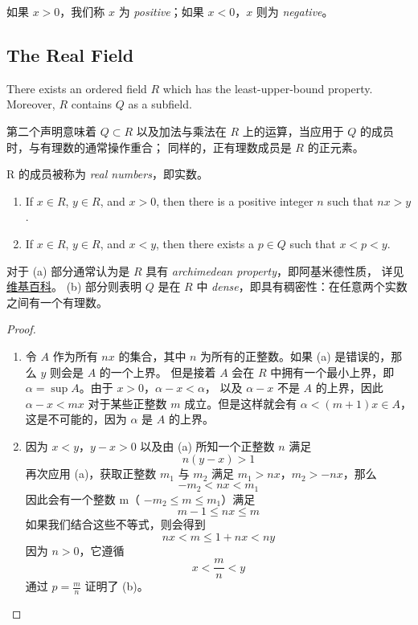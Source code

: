 \documentclass[../poma-notes.tex]{subfiles}
\begin{document}
如果 $x>0$，我们称 $x$ 为 \textit{positive}；如果 $x<0$，$x$ 则为 \textit{negative}。

\subsection*{The Real Field}

\setcounter{poma}{18}
\begin{theorem}
	There exists an ordered field $R$ which has the least-upper-bound property.
	Moreover, $R$ contains $Q$ as a subfield.
\end{theorem}

第二个声明意味着 $Q \subset R$ 以及加法与乘法在 $R$ 上的运算，当应用于 $Q$ 的成员时，与有理数的通常操作重合；
同样的，正有理数成员是 $R$ 的正元素。

R 的成员被称为 \textit{real numbers}，即实数。


\begin{theorem}
	\leavevmode
	\begin{enumerate}[label=(\alph*)]
		\item If $x \in R$, $y \in R$, and $x>0$, then there is a positive integer $n$ such that $nx>y$.
		\item If $x \in R$, $y \in R$, and $x<y$, then there exists a $p \in Q$ such that $x<p<y$.
	\end{enumerate}
\end{theorem}

对于 (a) 部分通常认为是 $R$ 具有 \textit{archimedean property}，即阿基米德性质，
详见\href{https://en.wikipedia.org/wiki/Archimedean_property}{维基百科}。
(b) 部分则表明 $Q$ 是在 $R$ 中 \textit{dense}，即具有稠密性：在任意两个实数之间有一个有理数。

\begin{proof}
	\begin{enumerate}[label=(\alph*)]
		\item 令 $A$ 作为所有 $nx$ 的集合，其中 $n$ 为所有的正整数。如果 (a) 是错误的，那么 $y$ 则会是 $A$ 的一个上界。
		      但是接着 $A$ 会在 $R$ 中拥有一个最小上界，即 $\alpha  = \sup A$。由于 $x>0$，$\alpha - x < \alpha$，
		      以及 $\alpha - x$ 不是 $A$ 的上界，因此 $\alpha - x < mx$ 对于某些正整数 $m$ 成立。但是这样就会有
		      $\alpha < (m+1)x \in A$，这是不可能的，因为 $\alpha$ 是 $A$ 的上界。
		\item 因为 $x<y$，$y-x>0$ 以及由 (a) 所知一个正整数 $n$ 满足
		      \[n(y-x)>1\]
		      再次应用 (a)，获取正整数 $m_1$ 与 $m_2$ 满足 $m_1 > nx$，$m_2 > -nx$，那么
		      \[-m_2 < nx < m_1\]
		      因此会有一个整数 m（ $-m_2 \le m \le m_1$）满足
		      \[m-1 \le nx \le m\]
		      如果我们结合这些不等式，则会得到
		      \[nx < m \le 1 + nx < ny\]
		      因为 $n>0$，它遵循
		      \[x < \frac{m}{n} < y\]
		      通过 $p=\frac{m}{n}$ 证明了 (b)。
	\end{enumerate}
\end{proof}
\end{document}
